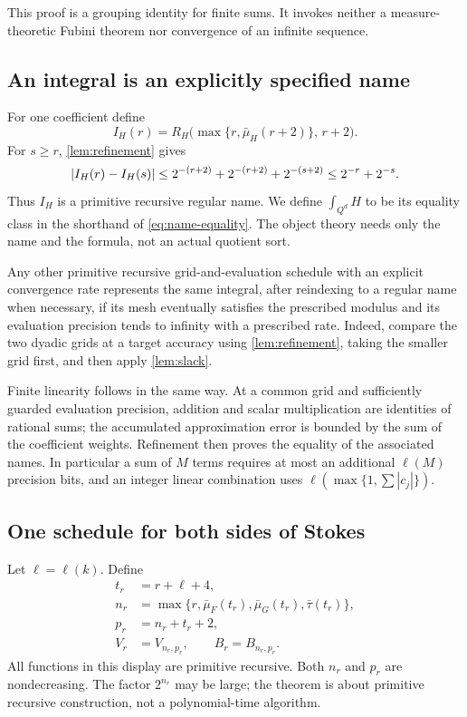 This proof is a grouping identity for finite sums. It invokes neither a
measure-theoretic Fubini theorem nor convergence of an infinite sequence.

\subsection{An integral is an explicitly specified name}

For one coefficient define
\begin{equation}\label{eq:generic-integral-name}
 I_H(r)=R_H\bigl(\max\{r,\bar\mu_H(r+2)\},\,r+2\bigr).
\end{equation}
For $s\ge r$, \cref{lem:refinement} gives
\[
 \left|I_H(r)-I_H(s)\right|
 \le 2^{-(r+2)}+2^{-(r+2)}+2^{-(s+2)}
 \le2^{-r}+2^{-s}.
\]
Thus $I_H$ is a primitive recursive regular name. We define
$\int_{Q^d}H$ to be its equality class in the shorthand of
\eqref{eq:name-equality}. The object theory needs only the name and the
formula, not an actual quotient sort.

Any other primitive recursive grid-and-evaluation schedule with an
explicit convergence rate represents the same integral, after
reindexing to a regular name when necessary, if its mesh
eventually satisfies the prescribed modulus and its evaluation precision
tends to infinity with a prescribed rate. Indeed, compare the two dyadic
grids at a target accuracy using \cref{lem:refinement}, taking the smaller
grid first, and then apply \cref{lem:slack}.

Finite linearity follows in the same way. At a common grid and sufficiently
guarded evaluation precision, addition and scalar multiplication are
identities of rational sums; the accumulated approximation error is
bounded by the sum of the coefficient weights. Refinement then proves
the equality of the associated names. In particular a sum of $M$ terms
requires at most an additional $\ell(M)$ precision bits, and an integer
linear combination uses $\ell(\max\{1,\sum|c_j|\})$.

\subsection{One schedule for both sides of Stokes}

Let $\ell=\ell(k)$. Define
\begin{align}
 t_r &= r+\ell+4,\label{eq:schedule-t}\\
 n_r &= \max\{r,\bar\mu_F(t_r),\bar\mu_G(t_r),\bar\tau(t_r)\},
       \label{eq:schedule-n}\\
 p_r &= n_r+t_r+2,\label{eq:schedule-p}\\
 V_r &= V_{n_r,p_r},\qquad B_r=B_{n_r,p_r}.\label{eq:schedule-values}
\end{align}
All functions in this display are primitive recursive. Both $n_r$ and
$p_r$ are nondecreasing. The factor $2^{n_r}$ may be large; the theorem is
about primitive recursive construction, not a polynomial-time algorithm.

